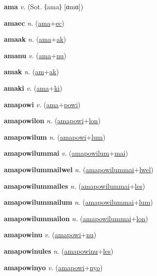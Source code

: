 \textbf{\hypertarget{ama}{ama}} \textit{v.} (Sot. ⟨ama⟩ [ɑmɑ])


\textbf{\hypertarget{amaec}{amaec}} \textit{n.} (\hyperlink{ama}{ama}+\allowbreak \hyperlink{ec}{ec})


\textbf{\hypertarget{amaak}{amaak}} \textit{n.} (\hyperlink{ama}{ama}+\allowbreak \hyperlink{ak}{ak})


\textbf{\hypertarget{amanu}{amanu}} \textit{v.} (\hyperlink{ama}{ama}+\allowbreak \hyperlink{nu}{nu})


\textbf{\hypertarget{amak}{amak}} \textit{n.} (\hyperlink{am}{am}+\allowbreak \hyperlink{ak}{ak})


\textbf{\hypertarget{amaki}{amaki}} \textit{v.} (\hyperlink{ama}{ama}+\allowbreak \hyperlink{ki}{ki})


\textbf{\hypertarget{amapowi}{amapowi}} \textit{v.} (\hyperlink{ama}{ama}+\allowbreak \hyperlink{powi}{powi})


\textbf{\hypertarget{amapowilon}{amapowilon}} \textit{n.} (\hyperlink{amapowi}{amapowi}+\allowbreak \hyperlink{lon}{lon})


\textbf{\hypertarget{amapowilum}{amapowilum}} \textit{n.} (\hyperlink{amapowi}{amapowi}+\allowbreak \hyperlink{lum}{lum})


\textbf{\hypertarget{amapowilummai}{amapowilummai}} \textit{v.} (\hyperlink{amapowilum}{amapowilum}+\allowbreak \hyperlink{mai}{mai})


\textbf{\hypertarget{amapowilummailwel}{amapowilummailwel}} \textit{n.} (\hyperlink{amapowilummai}{amapowilummai}+\allowbreak \hyperlink{lwel}{lwel})


\textbf{\hypertarget{amapowilummailes}{amapowilummailes}} \textit{n.} (\hyperlink{amapowilummai}{amapowilummai}+\allowbreak \hyperlink{les}{les})


\textbf{\hypertarget{amapowilummailum}{amapowilummailum}} \textit{n.} (\hyperlink{amapowilummai}{amapowilummai}+\allowbreak \hyperlink{lum}{lum})


\textbf{\hypertarget{amapowilummailon}{amapowilummailon}} \textit{n.} (\hyperlink{amapowilummai}{amapowilummai}+\allowbreak \hyperlink{lon}{lon})


\textbf{\hypertarget{amapowinu}{amapowinu}} \textit{v.} (\hyperlink{amapowi}{amapowi}+\allowbreak \hyperlink{nu}{nu})


\textbf{\hypertarget{amapowinules}{amapowinules}} \textit{n.} (\hyperlink{amapowinu}{amapowinu}+\allowbreak \hyperlink{les}{les})


\textbf{\hypertarget{amapowinyo}{amapowinyo}} \textit{v.} (\hyperlink{amapowi}{amapowi}+\allowbreak \hyperlink{nyo}{nyo})


